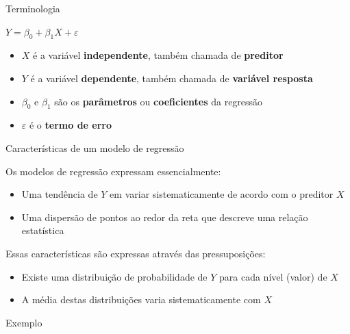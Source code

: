 \documentclass{beamer}\usepackage[]{graphicx}\usepackage[]{color}
\begin{document}
\begin{frame}{Terminologia}
\begin{center}
$Y = \beta _0 + \beta _1 X + \varepsilon$
\end{center}
\vfill
\begin{itemize}
  \item $X$ é a variável \textbf{independente}, também chamada de \textbf{preditor} \pause
  \item $Y$ é a variável \textbf{dependente}, também chamada de \textbf{variável resposta} \pause
  \item $\beta _0$ e $\beta _1$ são os \textbf{parâmetros} ou \textbf{coeficientes} da regressão \pause
  \item $\varepsilon$ é o \textbf{termo de erro}
\end{itemize}  
  
\end{frame}




\begin{frame}{Características de um modelo de regressão}

Os modelos de regressão expressam essencialmente:
\vfill
\begin{itemize}
  \item Uma tendência de $Y$ em variar sistematicamente de acordo com o preditor $X$ \pause
  \item Uma dispersão de pontos ao redor da reta que descreve uma relação estatística  \pause
  \end{itemize}
\vfill
Essas características são expressas através das pressuposições:
\vfill
\begin{itemize}
  \item Existe uma distribuição de probabilidade de $Y$ para cada nível (valor) de $X$ \pause
  \item A média destas distribuições varia sistematicamente com $X$
\end{itemize}  
  
\end{frame}

\begin{frame}{Exemplo}
\centering



\end{frame}
\end{document}
